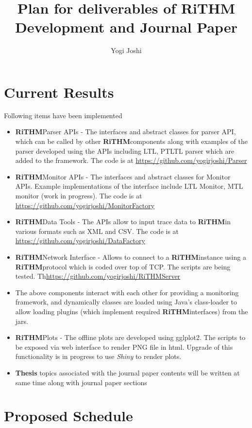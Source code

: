 \documentclass[]{article}
\title{ Plan for deliverables of \textbf{RiTHM} Development and Journal Paper}
\author{Yogi Joshi}
\newcommand{\rithm}{\textbf{RiTHM}\space}
\begin{document}
\maketitle

\section{Current Results}
Following items have been implemented
\begin{itemize}
	\item \rithm Parser APIs - The interfaces and abstract classes for parser API, which can be called by other \rithm components along with examples of the parser developed using the APIs  including LTL, PTLTL parser which are added to the framework. The code is at \url{https://github.com/yogirjoshi/Parser}
	\item \rithm Monitor APIs - The interfaces and abstract classes for Monitor APIs. Example implementations of the interface include LTL Monitor, MTL monitor (work in progress). The code is at \url{https://github.com/yogirjoshi/MonitorFactory}	
	\item \rithm Data Tools - The APIs allow to input trace data to \rithm in various formats such as XML and CSV. The code is at \url{https://github.com/yogirjoshi/DataFactory}
	\item \rithm Network Interface - Allows to connect to a \rithm instance using a \rithm protocol which is coded over top of TCP. The scripts are being tested. Th\url{https://github.com/yogirjoshi/RiTHMServer}
	\item The above components interact with each other for providing a monitoring framework, and dynamically classes are loaded using Java's class-loader to allow loading plugins (which implement required \rithm interfaces) from the jars. 
	\item \rithm Plots - The offline plots are developed using gglplot2. The scripts to be exposed via web interface to render PNG file in html. Upgrade of this functionality is in progress to use \textit{Shiny} to render plots.
	\item
	\textbf{Thesis} topics associated with the journal paper contents will be written at same time along with journal paper sections 
\end{itemize}
\section{Proposed Schedule}
\end{document}
